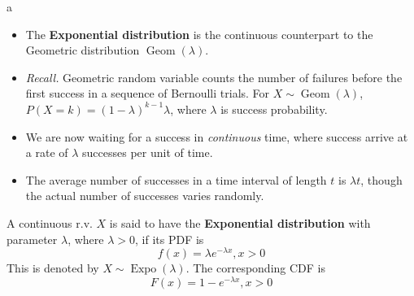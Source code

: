 \documentclass[8pt]{beamer}
\newcommand{\tb}[1]{\textbf{#1}}
\newcommand{\mygeom}[1]{\operatorname{Geom}\!\left(#1\right)}
\newcommand{\myexpo}[1]{\operatorname{Expo}\!\left(#1\right)}
\begin{document}
\begin{frame}{a}
    \begin{itemize}
        \item The \textbf{Exponential distribution} is the continuous counterpart to the Geometric distribution $\mygeom{\lambda}$.
        \item \textit{Recall.} Geometric random variable counts the number of failures before the first success in a sequence of Bernoulli trials. For $X \sim \mygeom{\lambda}$, $P(X=k) = (1-\lambda)^{k-1}\lambda$, where $\lambda$ is success probability.
        \item We are now waiting for a success in \textit{continuous} time, where success arrive at a rate of $\lambda$ successes per unit of time.
        \item The average number of successes in a time interval of length $t$ is $\lambda t$, though the actual number of successes varies randomly.
    \end{itemize}

    \begin{definition}
        A continuous r.v. $X$ is said to have the \tb{Exponential distribution} with parameter $\lambda$, where $\lambda > 0$, if its PDF is
        \[
        f(x) = \lambda e^{-\lambda x}, x>0
        \] 
        This is denoted by $X \sim \myexpo{\lambda}$.
        The corresponding CDF is 
        \[
        F(x) = 1 - e^{-\lambda x}, x>0
        \]
    \end{definition}

\end{frame}
\end{document}
